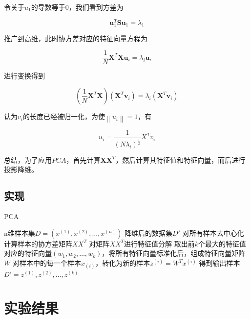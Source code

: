 \documentclass[UTF8]{ctexart}
\numberwithin{equation}{section}
\begin{document}
	令关于$u_{1}$的导数等于$0$，我们看到方差为
	
	\begin{equation}
	\boldsymbol{u}_{1}^{T} \boldsymbol{S u}_{1}=\lambda_{1}\tag{11}
	\end{equation}
	
	推广到高维，此时协方差对应的特征向量方程为
	
	\begin{equation}
	\frac{1}{N} \boldsymbol{X}^{T} \boldsymbol{X} \boldsymbol{u}_{i}=\lambda_{i} \boldsymbol{u}_{i}\tag{12}
	\end{equation}
	
	进行变换得到
	
	\begin{equation}
	\left(\frac{1}{N} \boldsymbol{X}^{T} \boldsymbol{X}\right)\left(\boldsymbol{X}^{T} \boldsymbol{v}_{i}\right)=\lambda_{i}\left(\boldsymbol{X}^{T} \boldsymbol{v}_{i}\right)\tag{13}
	\end{equation}
	
	认为$v_{i}$的长度已经被归一化，为使$\left\|u_{i}\right\|=1$，有
	
	\begin{equation}
	u_{i}=\frac{1}{\left(N \lambda_{i}\right)^{\frac{1}{2}}} X^{T} v_{i}\tag{14}
	\end{equation}
	
	总结，为了应用$PCA$，首先计算$\boldsymbol{X} \boldsymbol{X}^{T}$，然后计算其特征值和特征向量，而后进行投影降维。
	
	\subsection{实现}
		\begin{algorithm}
			\caption{PCA}
			\begin{algorithmic}[1]
				\Require n维样本集$D=(x^{(1)}, x^{(2)}, \dotsc , x^{(n)})$
				\Ensure 降维后的数据集$D'$
				\State 对所有样本去中心化
				\State 计算样本的协方差矩阵$XX^T$
				\State 对矩阵$XX^T$进行特征值分解
				\State 取出前$k$个最大的特征值对应的特征向量$(w_{1}, w_{2}, \dotsc , w_{k})$，将所有特征向量标准化后，组成特征向量矩阵$W$
				\State 对样本中的每一个样本$x_{(i)}$，转化为新的样本$z^{(i)} = W^{T}x^{(i)}$
				\State 得到输出样本$D'={z^{(1)}, z^{(2)}, \dotsc , z^{(k)}}$
				\EndFunction
			\end{algorithmic}
		\end{algorithm}
	
	\section{实验结果}
	
\end{document}
